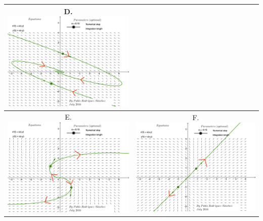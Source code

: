 \begin{tabular}{|c|c|}
D. \includegraphics[width=0.45\tw]{14/14-complex-neg.png} \\
\hline
E. \includegraphics[width=0.45\tw]{14/14-complex-pos.png} &
F. \includegraphics[width=0.45\tw]{14/14-repeated-pos.png} \\
\hline
\end{tabular}


